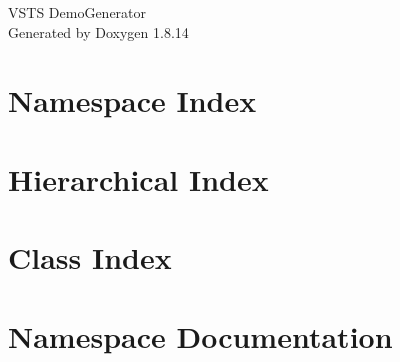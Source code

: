\documentclass[twoside]{book}
\newcommand{\+}{\discretionary{\mbox{\scriptsize$\hookleftarrow$}}{}{}}
\newcommand{\clearemptydoublepage}{%
  \newpage{\pagestyle{empty}\cleardoublepage}%
}
\begin{document}
\hypersetup{pageanchor=false,
             bookmarksnumbered=true,
             pdfencoding=unicode
            }
\begin{titlepage}
\vspace*{7cm}
\begin{center}%
{\Large V\+S\+TS Demo\+Generator }\\
\vspace*{1cm}
{\large Generated by Doxygen 1.8.14}\\
\end{center}
\end{titlepage}
\clearemptydoublepage
{}
\tableofcontents
\clearemptydoublepage
{}
\hypersetup{pageanchor=true}

\chapter{Namespace Index}

\chapter{Hierarchical Index}

\chapter{Class Index}

\chapter{Namespace Documentation}




























\end{document}
